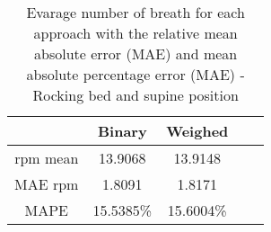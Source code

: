 
\begin{table}[h]

    \centering

\begin{tabular}{|c|c|c|c|c|}
\hline 
& Binary & Weighed \\ 
 
\hline 
rpm mean & 13.9068 &  13.9148  \\  
MAE rpm   &  1.8091&      1.8171 \\ 
MAPE   & 15.5385\% &  15.6004\% \\ 

\hline 
\end{tabular}
\caption{Evarage number of breath for each approach with the relative mean
absolute error (MAE) and mean absolute percentage error (MAE) - Rocking bed
and supine position}
\label{tab:SupineRockingMetricssg}
\end{table}